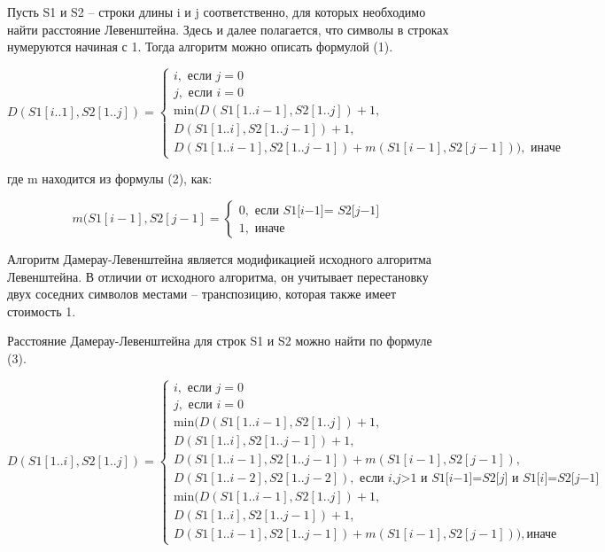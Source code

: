 \documentclass{article}
\begin{document}
Пусть S1 и S2 – строки длины i и j соответственно, для которых необходимо найти расстояние Левенштейна. Здесь и далее полагается, что символы в строках нумеруются начиная с 1. Тогда алгоритм можно описать формулой (1).

\begin{equation*}
D(S1[i..1],S2[1..j]) = 
 \begin{cases}
	i,  \mbox{  если  }  𝑗=0\\
      j,  \mbox{  если  } 𝑖=0\\
	\mbox{min}(𝐷(𝑆1[1..𝑖−1],𝑆2[1..𝑗])+1,\\ 
				𝐷(𝑆1[1..𝑖],𝑆2[1..𝑗−1])+1, \\
				𝐷(𝑆1[1..𝑖−1],𝑆2[1..𝑗−1])+𝑚(𝑆1[𝑖−1],𝑆2[𝑗−1])), \mbox{  иначе}
\end{cases}
\end{equation*}

где m находится из формулы (2), как:

\begin{equation*}
𝑚(𝑆1[𝑖−1],𝑆2[𝑗−1] = 
 \begin{cases}
	0,  \mbox {  если  𝑆1[𝑖−1]= 𝑆2[𝑗−1]  } \\
	1, \mbox {  иначе  }
\end{cases}
\end{equation*}

Алгоритм Дамерау-Левенштейна является модификацией исходного алгоритма Левенштейна. В отличии от исходного алгоритма, он учитывает перестановку двух соседних символов местами – транспозицию, которая также имеет стоимость 1.

Расстояние Дамерау-Левенштейна для строк S1 и S2 можно найти по формуле (3).

\begin{equation*}
𝐷(𝑆1[1..𝑖],𝑆2[1..𝑗]) = 
 \begin{cases}
	i,  \mbox{  если  }  𝑗=0\\
      j,  \mbox{  если  }  𝑖=0\\
	\mbox{min}(𝐷(𝑆1[1..𝑖−1],𝑆2[1..𝑗])+1,\\ 
		𝐷(𝑆1[1..𝑖],𝑆2[1..𝑗−1])+1,\\ 
		𝐷(𝑆1[1..𝑖−1],𝑆2[1..𝑗−1])+𝑚(𝑆1[𝑖−1],𝑆2[𝑗−1]),\\
		𝐷(𝑆1[1..𝑖−2],𝑆2[1..𝑗−2]), \mbox {  если 𝑖,𝑗>1 и 𝑆1[𝑖−1]=𝑆2[𝑗] и 𝑆1[𝑖]=𝑆2[𝑗−1]  } \\
	\mbox{min}(𝐷(𝑆1[1..𝑖−1],𝑆2[1..𝑗])+1,\\
		𝐷(𝑆1[1..𝑖],𝑆2[1..𝑗−1])+1, \\
		𝐷(𝑆1[1..𝑖−1],𝑆2[1..𝑗−1])+𝑚(𝑆1[𝑖−1],𝑆2[𝑗−1])), \mbox {иначе}		
\end{cases}
\end{equation*}
\end{document}
